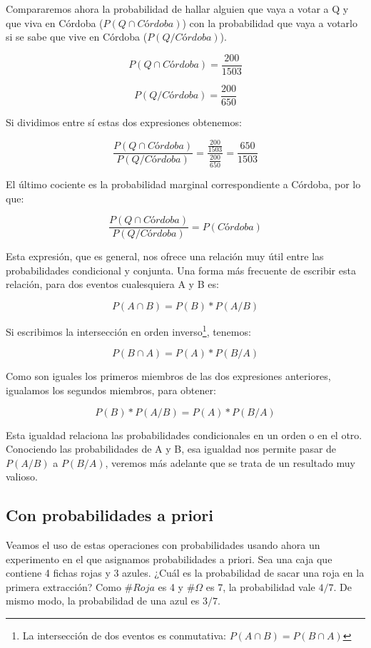 \documentclass[]{book}
\let\rmarkdownfootnote\footnote%
\def\footnote{\protect\rmarkdownfootnote}
\begin{document}
Compararemos ahora la probabilidad de hallar alguien que vaya a votar a Q y que viva en Córdoba (\(P(Q \cap Córdoba)\)) con la probabilidad que vaya a votarlo si se sabe que vive en Córdoba (\(P(Q/Córdoba)\)).

\[P(Q \cap Córdoba) = \frac{200}{1503}\]

\[P(Q/Córdoba) = \frac{200}{650}\]

Si dividimos entre sí estas dos expresiones obtenemos:

\[\frac{P(Q \cap Córdoba)}{P(Q/Córdoba)} = \frac{\frac{200}{1503}}{\frac{200}{650}} = \frac{650}{1503}\]

El último cociente es la probabilidad marginal correspondiente a
Córdoba, por lo que:

\[\frac{P(Q \cap Córdoba)}{P(Q/Córdoba)} = P(Córdoba)\]

Esta expresión, que es general, nos ofrece una relación muy útil entre las probabilidades condicional y conjunta. Una forma más frecuente de escribir esta relación, para dos eventos cualesquiera A y B es:

\[P(A \cap B) = P(B)*P(A/B)\]

Si escribimos la intersección en orden inverso\footnote{La intersección de dos eventos es conmutativa: \(P(A \cap B)=P(B \cap A)\)}, tenemos:

\[P(B \cap A) = P(A)*P(B/A)\]

Como son iguales los primeros miembros de las dos expresiones anteriores, igualamos los segundos miembros, para obtener:

\[P(B)*P(A/B) = P(A)*P(B/A)\]

Esta igualdad relaciona las probabilidades condicionales en un orden o
en el otro. Conociendo las probabilidades de A y B, esa igualdad nos
permite pasar de \(P(A/B)\) a \(P(B/A)\), veremos más adelante que se trata de un resultado muy valioso.

\hypertarget{con-probabilidades-a-priori}{%
\subsection{Con probabilidades a priori}\label{con-probabilidades-a-priori}}

Veamos el uso de estas operaciones con probabilidades usando ahora un
experimento en el que asignamos probabilidades a priori. Sea una caja
que contiene 4 fichas rojas y 3 azules. ¿Cuál es la probabilidad de
sacar una roja en la primera extracción? Como \(\#Roja\) es 4 y \(\#\Omega\) es 7, la probabilidad vale \(4/7\). De mismo modo, la probabilidad de una azul es \(3/7\).
\end{document}
